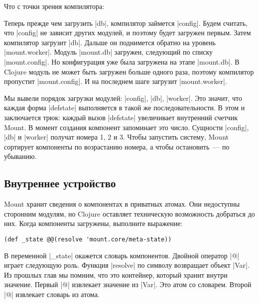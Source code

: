 Что с точки зрения компилятора:


Теперь прежде чем загрузить \spverb|db|, компилятор займется \spverb|config|. Будем считать,
что \spverb|config| не зависит других модулей, и поэтому будет загружен первым. Затем
компилятор загрузит \spverb|db|. Дальше он поднимется обратно на уровень
\spverb|mount.worker|. Модуль \spverb|mount.db| загружен, следующий по списку
\spverb|mount.config|. Но конфигурация уже была загружена на этапе \spverb|mount.db|. В
Clojure модуль не может быть загружен больше одного раза, поэтому компилятор
пропустит \spverb|mount.config|. И на последнем шаге загрузит \spverb|mount.worker|.

Мы вывели порядок загрузки модулей: \spverb|config|, \spverb|db|, \spverb|worker|. Это значит, что
каждая форма \spverb|defstate| выполняется в такой же последовательности. В этом и
заключается трюк: каждый вызов \spverb|defstate| увеличивает внутренний счетчик
Mount. В момент создания компонент запоминает это число. Сущности \spverb|config|, \spverb|db|
и \spverb|worker| получат номера 1, 2 и 3. Чтобы запустить систему, Mount сортирует
компоненты по возрастанию номера, а чтобы остановить~--- по убыванию.

\subsection{Внутреннее устройство}

Mount хранит сведения о компонентах в приватных атомах. Они недоступны сторонним
модулям, но Clojure оставляет техническую возможность добраться до них. Когда
компоненты загружены, выполните выражение:

\begin{verbatim}
(def _state @@(resolve 'mount.core/meta-state))
\end{verbatim}

В переменной \spverb|_state| окажется словарь компонентов. Двойной оператор \spverb|@| играет
следующую роль. Функция \spverb|resolve| по символу возвращает объект \spverb|Var|. Из прошлых
глав мы помним, что это контейнер, который хранит внутри значение. Первый \spverb|@|
извлекает значение из \spverb|Var|. Это атом со словарем. Второй \spverb|@| извлекает словарь
из атома.

